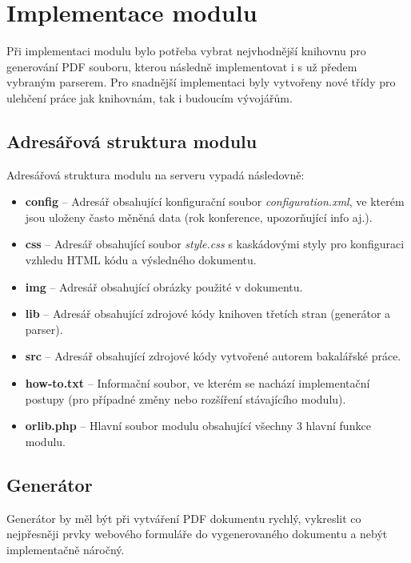 \DeclarePairedDelimiter\ceil{\lceil}{\rceil}
\DeclarePairedDelimiter\floor{\lfloor}{\rfloor}

\chapter{Implementace modulu}
Při implementaci modulu bylo potřeba vybrat nejvhodnější knihovnu pro generování PDF souboru, kterou následně implementovat i s už předem vybraným parserem. Pro snadnější implementaci byly vytvořeny nové třídy pro ulehčení práce jak knihovnám, tak i budoucím vývojářům.
\section{Adresářová struktura modulu}
Adresářová struktura modulu na serveru vypadá následovně:
\begin{itemize}
	\item \textbf{config} -- Adresář obsahující konfigurační soubor \textit{configuration.xml}, ve kterém jsou uloženy často měněná data (rok konference, upozorňující info aj.).  
	\item \textbf{css} --  Adresář obsahující soubor \textit{style.css} s kaskádovými styly pro konfiguraci vzhledu HTML kódu a výsledného dokumentu. 
	\item \textbf{img} -- Adresář obsahující obrázky použité v dokumentu.
	\item \textbf{lib} -- Adresář obsahující zdrojové kódy knihoven třetích stran (generátor a parser).
	\item \textbf{src} -- Adresář obsahující zdrojové kódy vytvořené autorem bakalářské práce.
	\item \textbf{how-to.txt} -- Informační soubor, ve kterém se nachází implementační postupy (pro případné změny nebo rozšíření stávajícího modulu).
	\item \textbf{orlib.php} -- Hlavní soubor modulu obsahující všechny 3 hlavní funkce modulu.
\end{itemize}

\section{Generátor}
Generátor by měl být při vytváření PDF dokumentu rychlý, vykreslit co nejpřesněji prvky webového formuláře do vygenerovaného dokumentu a nebýt implementačně náročný.  
